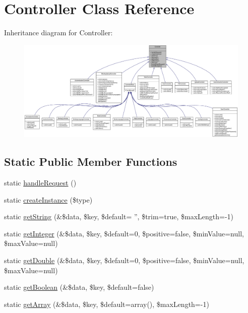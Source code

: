 \hypertarget{classController}{
\section{Controller Class Reference}
\label{classController}
}


Inheritance diagram for Controller:\nopagebreak
\begin{figure}[H]
\begin{center}
\leavevmode
\includegraphics[width=400pt]{classController__inherit__graph}
\end{center}
\end{figure}
\subsection*{Static Public Member Functions}
\begin{DoxyCompactItemize}
\item 
static \hyperlink{classController_a772b295e218a0ae1b1614239a441baee}{handleRequest} ()
\item 
static \hyperlink{classController_aafbd169c4ea409841c28d01db9081c83}{createInstance} (\$type)
\item 
static \hyperlink{classController_afe45c54a315e0b5e17ac527df866550d}{getString} (\&\$data, \$key, \$default= '', \$trim=true, \$maxLength=-\/1)
\item 
static \hyperlink{classController_a54a271ee06846fdefff68d7127ff2988}{getInteger} (\&\$data, \$key, \$default=0, \$positive=false, \$minValue=null, \$maxValue=null)
\item 
static \hyperlink{classController_a948395589a3d40710b24dd5e48cfe65c}{getDouble} (\&\$data, \$key, \$default=0, \$positive=false, \$minValue=null, \$maxValue=null)
\item 
static \hyperlink{classController_aecd39da8a4e4e01b423691e681056fd1}{getBoolean} (\&\$data, \$key, \$default=false)
\item 
static \hyperlink{classController_ae226e2b1c593b5a0e1c406d9ae5b3c21}{getArray} (\&\$data, \$key, \$default=array(), \$maxLength=-\/1)
\end{DoxyCompactItemize}


